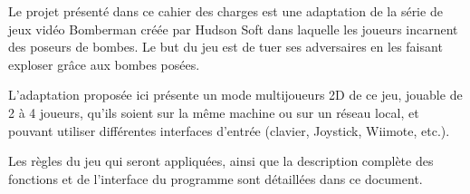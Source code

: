 Le projet présenté dans ce cahier des charges est une adaptation de la série de jeux vidéo Bomberman créée par Hudson Soft dans laquelle les joueurs incarnent des poseurs de bombes. Le but du jeu est de tuer ses adversaires en les faisant exploser grâce aux bombes posées.

L'adaptation proposée ici présente un mode multijoueurs 2D de ce jeu, jouable de 2 à 4 joueurs, qu'ils soient sur la même machine ou sur un réseau local, et pouvant utiliser différentes interfaces d'entrée (clavier, Joystick, Wiimote, etc.).

Les règles du jeu qui seront appliquées, ainsi que la description complète des fonctions et de l'interface du programme sont détaillées dans ce document.